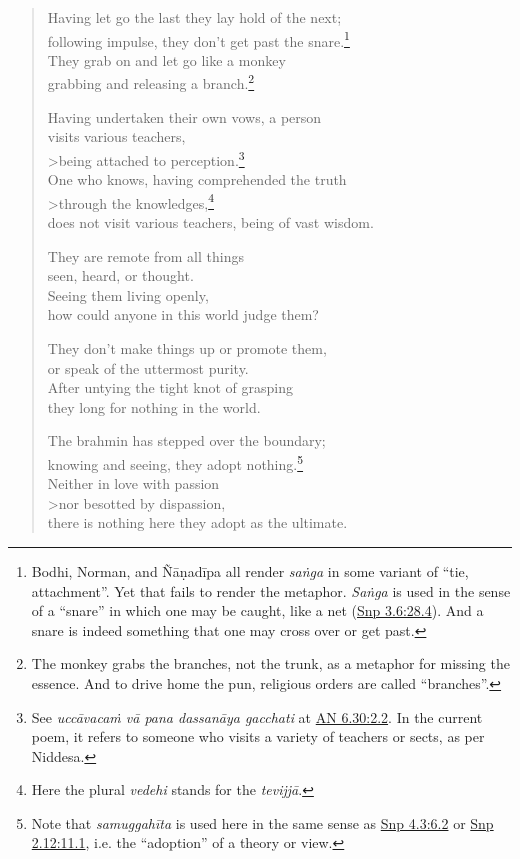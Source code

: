 \documentclass[12pt,openany]{book}%
\begin{document}
\begin{verse}
Having let go the last they lay hold of the next; \\
following impulse, they don’t get past the snare.\footnote{Bodhi, Norman, and \textsanskrit{Ñāṇadīpa} all render \textit{\textsanskrit{saṅga}} in some variant of “tie, attachment”. Yet that fails to render the metaphor. \textit{\textsanskrit{Saṅga}} is used in the sense of a “snare” in which one may be caught, like a net (\href{https://suttacentral.net/snp3.6/en/sujato\#28.4}{Snp 3.6:28.4}). And a snare is indeed something that one may cross over or get past. } \\
They grab on and let go like a monkey \\
grabbing and releasing a branch.\footnote{The monkey grabs the branches, not the trunk, as a metaphor for missing the essence. And to drive home the pun, religious orders are called “branches”. } 

Having undertaken their own vows, a person \\
visits various teachers, \\>being attached to perception.\footnote{See \textit{\textsanskrit{uccāvacaṁ} \textsanskrit{vā} pana \textsanskrit{dassanāya} gacchati} at \href{https://suttacentral.net/an6.30/en/sujato\#2.2}{AN 6.30:2.2}. In the current poem, it refers to someone who visits a variety of teachers or sects, as per Niddesa. } \\
One who knows, having comprehended the truth \\>through the knowledges,\footnote{Here the plural \textit{vedehi} stands for the \textit{\textsanskrit{tevijjā}}. } \\
does not visit various teachers, being of vast wisdom. 

They are remote from all things \\
seen, heard, or thought. \\
Seeing them living openly, \\
how could anyone in this world judge them? 

They don’t make things up or promote them, \\
or speak of the uttermost purity. \\
After untying the tight knot of grasping \\
they long for nothing in the world. 

The brahmin has stepped over the boundary; \\
knowing and seeing, they adopt nothing.\footnote{Note that \textit{\textsanskrit{samuggahīta}} is used here in the same sense as \href{https://suttacentral.net/snp4.3/en/sujato\#6.2}{Snp 4.3:6.2} or \href{https://suttacentral.net/snp2.12/en/sujato\#11.1}{Snp 2.12:11.1}, i.e. the “adoption” of a theory or view. } \\
Neither in love with passion \\>nor besotted by dispassion, \\
there is nothing here they adopt as the ultimate. 

%
\end{verse}
\end{document}
